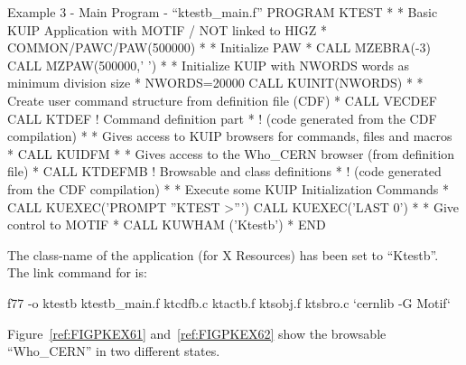 \begin{XMPt} {Example 3 - Main Program - ``ktestb\_main.f''}
      PROGRAM KTEST
*
* Basic KUIP Application with MOTIF / NOT linked to HIGZ
*
      COMMON/PAWC/PAW(500000)
*
* Initialize PAW
*
      CALL MZEBRA(-3)
      CALL MZPAW(500000,' ')
*
* Initialize KUIP with NWORDS words as minimum division size
*
      NWORDS=20000
      CALL KUINIT(NWORDS)
*
* Create user command structure from definition file (CDF)
*
      CALL VECDEF
      CALL KTDEF          ! Command definition part
*                         ! (code generated from the CDF compilation)
*
* Gives access to KUIP browsers for commands, files and macros
*
      CALL KUIDFM
*
* Gives access to the Who_CERN browser (from definition file)
*
      CALL KTDEFMB        ! Browsable and class definitions 
*                         ! (code generated from the CDF compilation)
*
* Execute some KUIP Initialization Commands
*
      CALL KUEXEC('PROMPT ''KTEST >''')
      CALL KUEXEC('LAST 0')
*
* Give control to MOTIF
*
      CALL KUWHAM ('Ktestb')
*   
      END
\end{XMPt}
The class-name of the application (for X Resources) has been set to
``Ktestb''.
The link command for  is:
\begin{XMP}
f77 -o ktestb ktestb_main.f ktcdfb.c ktactb.f ktsobj.f ktsbro.c `cernlib -G Motif`
\end{XMP}
Figure~\ref{ref:FIGPKEX61} and~\ref{ref:FIGPKEX62}
show the browsable ``Who\_CERN'' in two different states.

